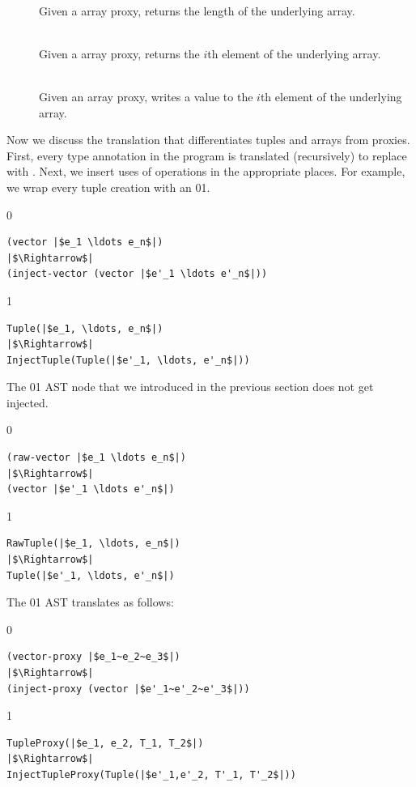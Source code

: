 \documentclass[7x10]{TimesAPriori_MIT}%
\def\racketEd{0}
\def\pythonEd{1}
\def\edition{1}
\newcommand{\racket}[1]{{\if\edition\racketEd{#1}\fi}}
\newcommand{\pythonColor}[0]{}
\newcommand{\python}[1]{{\if\edition\pythonEd\pythonColor #1\fi}}
\numberwithin{theorem}{chapter}
\numberwithin{definition}{chapter}
\numberwithin{equation}{chapter}
\begin{document}
{\begin{description}
\item[]\ \\
%
  Given a array proxy, returns the length of the underlying array.
  
\item[]\ \\
%
  Given a array proxy, returns the $i$th element of the underlying
  array.

\item[]\ \\
%  
    Given an array proxy, writes a value to the $i$th element of the
    underlying array.
\end{description}

\fi}

Now we discuss the translation that differentiates tuples and arrays
from proxies. First, every type annotation in the program is
translated (recursively) to replace \TUPLETYPENAME{} with \PTUPLETYNAME{}.
Next, we insert uses of \PTUPLETYNAME{} operations in the appropriate
places. For example, we wrap every tuple creation with an
\racket{}\python{}.
%
{\if\edition\racketEd
\begin{minipage}{0.96\textwidth}
\begin{lstlisting}
(vector |$e_1 \ldots e_n$|)
|$\Rightarrow$|
(inject-vector (vector |$e'_1 \ldots e'_n$|))
\end{lstlisting}
\end{minipage}
\fi}
{\if\edition\pythonEd\pythonColor    
\begin{lstlisting}
Tuple(|$e_1, \ldots, e_n$|)
|$\Rightarrow$|
InjectTuple(Tuple(|$e'_1, \ldots, e'_n$|))
\end{lstlisting}
\fi}

The \racket{}\python{}
AST node that we introduced in the previous
section does not get injected.
{\if\edition\racketEd    
\begin{lstlisting}
(raw-vector |$e_1 \ldots e_n$|)
|$\Rightarrow$|
(vector |$e'_1 \ldots e'_n$|)
\end{lstlisting}
\fi}
{\if\edition\pythonEd\pythonColor    
\begin{lstlisting}
RawTuple(|$e_1, \ldots, e_n$|)
|$\Rightarrow$|
Tuple(|$e'_1, \ldots, e'_n$|)
\end{lstlisting}
\fi}

The \racket{}\python{} AST
translates as follows:
%
{\if\edition\racketEd    
\begin{lstlisting}
(vector-proxy |$e_1~e_2~e_3$|)
|$\Rightarrow$|
(inject-proxy (vector |$e'_1~e'_2~e'_3$|))
\end{lstlisting}
\fi}
{\if\edition\pythonEd\pythonColor
\begin{lstlisting}
TupleProxy(|$e_1, e_2, T_1, T_2$|)
|$\Rightarrow$|
InjectTupleProxy(Tuple(|$e'_1,e'_2, T'_1, T'_2$|))
\end{lstlisting}
\fi}
\end{document}
